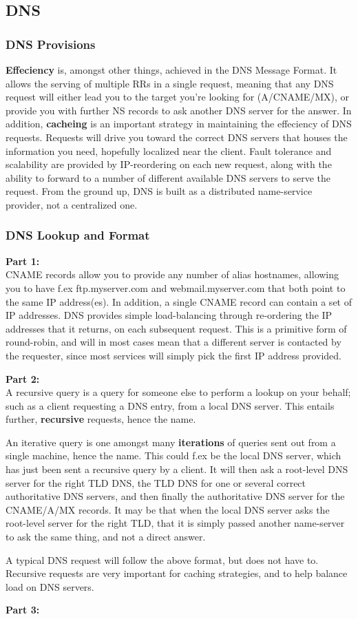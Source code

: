 \subsection{DNS}
\subsubsection{DNS Provisions}
\textbf{Effeciency} is, amongst other things, achieved in the DNS Message Format. It allows the serving of multiple RRs 
in a single request, meaning that any DNS request will either lead you to the target you're looking for (A/CNAME/MX), or
provide you with further NS records to ask another DNS server for the answer. In addition, \textbf{cacheing} is an important
strategy in maintaining the effeciency of DNS requests. Requests will drive you toward the correct DNS servers that
houses the information you need, hopefully localized near the client. Fault tolerance and scalability are provided by IP-reordering
on each new request, along with the ability to forward to a number of different available DNS servers to serve the request. From the ground
up, DNS is built as a distributed name-service provider, not a centralized one.

\subsubsection{DNS Lookup and Format}
\textbf{Part 1:}\\
CNAME records allow you to provide any number of alias hostnames, allowing you to have f.ex ftp.myserver.com and webmail.myserver.com
that both point to the same IP address(es). In addition, a single CNAME record can contain a set of IP addresses. DNS provides simple 
load-balancing through re-ordering the IP addresses that it returns, on each subsequent request. This is a primitive form of round-robin, 
and will in most cases mean that a different server is contacted by the requester, since most services will simply pick the first IP address
provided. 

\noindent \textbf{Part 2:}\\
A recursive query is a query for someone else to perform a lookup on your behalf; such as a client requesting a DNS entry, from a local DNS server.
This entails further, \textbf{recursive} requests, hence the name.

An iterative query is one amongst many \textbf{iterations} of queries sent out from a single machine, hence the name. This could f.ex be the
local DNS server, which has just been sent a recursive query by a client. It will then ask a root-level DNS server for the right TLD DNS, the
TLD DNS for one or several correct authoritative DNS servers, and then finally the authoritative DNS server for the CNAME/A/MX records. It may
be that when the local DNS server asks the root-level server for the right TLD, that it is simply passed another name-server to ask the same
thing, and not a direct answer.

A typical DNS request will follow the above format, but does not have to. Recursive requests are very important for caching strategies, and
to help balance load on DNS servers.

\noindent \textbf{Part 3:}\\


\subsubsection{}
